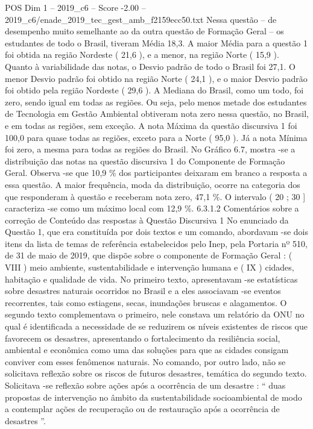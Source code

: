 \begin{textsample}{POS Dim 1 – 2019\_c6 – Score -2.00 – 2019\_c6/enade\_2019\_tec\_gest\_amb\_f2159ecc50.txt}
Nessa questão – de desempenho muito semelhante ao da outra questão de Formação Geral – os estudantes de todo o Brasil, tiveram Média 18,3.
A maior Média para a questão 1 foi obtida na região Nordeste ( 21,6 ), e a menor, na região Norte ( 15,9 ).
Quanto à variabilidade das notas, o Desvio padrão de todo o Brasil foi 27,1.
O menor Desvio padrão foi obtido na região Norte ( 24,1 ), e o maior Desvio padrão foi obtido pela região Nordeste ( 29,6 ).
A Mediana do Brasil, como um todo, foi zero, sendo igual em todas as regiões.
Ou seja, pelo menos metade dos estudantes de Tecnologia em Gestão Ambiental obtiveram nota zero nessa questão, no Brasil, e em todas as regiões, sem exceção.
A nota Máxima da questão discursiva 1 foi 100,0 para quase todas as regiões, exceto para a Norte ( 95,0 ).
Já a nota Mínima foi zero, a mesma para todas as regiões do Brasil.
No Gráfico 6.7, mostra -se a distribuição das notas na questão discursiva 1 do Componente de Formação Geral.
Observa -se que 10,9 \% dos participantes deixaram em branco a resposta a essa questão.
A maior frequência, moda da distribuição, ocorre na categoria dos que responderam à questão e receberam nota zero, 47,1 \%.
O intervalo ( 20 ; 30 ] caracteriza -se como um máximo local com 12,9 \%. 6.3.1.2 Comentários sobre a correção de Conteúdo das respostas à Questão Discursiva 1 No enunciado da Questão 1, que era constituída por dois textos e um comando, abordavam -se dois itens da lista de temas de referência estabelecidos pelo Inep, pela Portaria nº 510, de 31 de maio de 2019, que dispõe sobre o componente de Formação Geral : ( VIII ) meio ambiente, sustentabilidade e intervenção humana e ( IX ) cidades, habitação e qualidade de vida.
No primeiro texto, apresentavam -se estatísticas sobre desastres naturais ocorridos no Brasil e a eles associavam -se eventos recorrentes, tais como estiagens, secas, inundações bruscas e alagamentos.
O segundo texto complementava o primeiro, nele constava um relatório da ONU no qual é identificada a necessidade de se reduzirem os níveis existentes de riscos que favorecem os desastres, apresentando o fortalecimento da resiliência social, ambiental e econômica como uma das soluções para que as cidades consigam conviver com esses fenômenos naturais.
No comando, por outro lado, não se solicitava reflexão sobre os riscos de futuros desastres, temática do segundo texto.
Solicitava -se reflexão sobre ações após a ocorrência de um desastre : “ duas propostas de intervenção no âmbito da sustentabilidade socioambiental de modo a contemplar ações de recuperação ou de restauração após a ocorrência de desastres ”.

\end{textsample}
